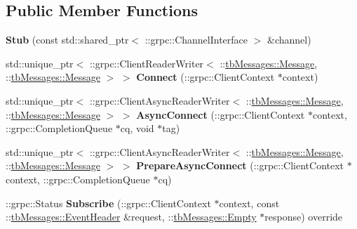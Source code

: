 \subsection*{Public Member Functions}
\begin{DoxyCompactItemize}
\item 
\mbox{\label{classtbMessages_1_1TarboraMessages_1_1Stub_abe391a503594c948f43b4678be23c5ba}} 
{\bfseries Stub} (const std\+::shared\+\_\+ptr$<$ \+::grpc\+::\+Channel\+Interface $>$ \&channel)
\item 
\mbox{\label{classtbMessages_1_1TarboraMessages_1_1Stub_a93e6035200efa5656f2687c6ed034219}} 
std\+::unique\+\_\+ptr$<$ \+::grpc\+::\+Client\+Reader\+Writer$<$ \+::\hyperlink{classtbMessages_1_1Message}{tb\+Messages\+::\+Message}, \+::\hyperlink{classtbMessages_1_1Message}{tb\+Messages\+::\+Message} $>$ $>$ {\bfseries Connect} (\+::grpc\+::\+Client\+Context $\ast$context)
\item 
\mbox{\label{classtbMessages_1_1TarboraMessages_1_1Stub_a4a797387c2f8f8c8c561725f10c15ea2}} 
std\+::unique\+\_\+ptr$<$ \+::grpc\+::\+Client\+Async\+Reader\+Writer$<$ \+::\hyperlink{classtbMessages_1_1Message}{tb\+Messages\+::\+Message}, \+::\hyperlink{classtbMessages_1_1Message}{tb\+Messages\+::\+Message} $>$ $>$ {\bfseries Async\+Connect} (\+::grpc\+::\+Client\+Context $\ast$context, \+::grpc\+::\+Completion\+Queue $\ast$cq, void $\ast$tag)
\item 
\mbox{\label{classtbMessages_1_1TarboraMessages_1_1Stub_a6d7d47e6587f79ccfecb54bea7f7c526}} 
std\+::unique\+\_\+ptr$<$ \+::grpc\+::\+Client\+Async\+Reader\+Writer$<$ \+::\hyperlink{classtbMessages_1_1Message}{tb\+Messages\+::\+Message}, \+::\hyperlink{classtbMessages_1_1Message}{tb\+Messages\+::\+Message} $>$ $>$ {\bfseries Prepare\+Async\+Connect} (\+::grpc\+::\+Client\+Context $\ast$context, \+::grpc\+::\+Completion\+Queue $\ast$cq)
\item 
\mbox{\label{classtbMessages_1_1TarboraMessages_1_1Stub_a4c072a6b1df99eb1c0d1b6533c1f6583}} 
\+::grpc\+::\+Status {\bfseries Subscribe} (\+::grpc\+::\+Client\+Context $\ast$context, const \+::\hyperlink{classtbMessages_1_1EventHeader}{tb\+Messages\+::\+Event\+Header} \&request, \+::\hyperlink{classtbMessages_1_1Empty}{tb\+Messages\+::\+Empty} $\ast$response) override

\end{DoxyCompactItemize}
